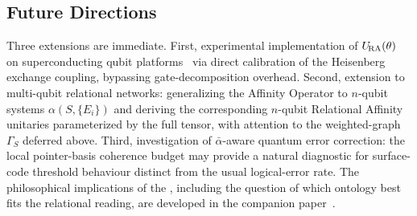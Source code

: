 \subsection{Future Directions}

Three extensions are immediate.
First, experimental implementation of $U_{\!\mathrm{RA}}(\theta)$ on superconducting
qubit platforms~\cite{Krantz2019} via direct calibration of the
Heisenberg exchange coupling, bypassing gate-decomposition overhead.
Second, extension to multi-qubit relational networks: generalizing the
Affinity Operator to $n$-qubit systems $\alpha(S,\{E_i\})$ and deriving
the corresponding $n$-qubit Relational Affinity unitaries parameterized
by the full tensor, with attention to the weighted-graph $\Gamma_S$
deferred above.
Third, investigation of $\bar\alpha$-aware quantum error correction:
the local pointer-basis coherence budget may provide a natural
diagnostic for surface-code threshold behaviour distinct from the usual
logical-error rate.
The philosophical implications of the \RCF, including the question of which ontology best fits the relational reading, are developed in the companion paper~\cite{Adams2026Philosophy}.
